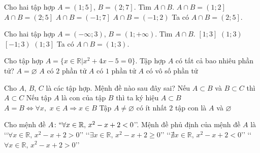 \begin{ex}%
Cho hai tập hợp $ A=\left(1;5 \right]$, $ B=\left(2;7 \right]$. Tìm $A\cap B$.	
	\choice
	{$ A\cap B=\left(1;2 \right]$}
	{\True $ A\cap B=\left(2;5 \right]$}
	{$ A\cap B=\left(-1;7 \right]$}
	{$ A\cap B=\left(-1;2 \right)$}
	\loigiai
	{
Ta có $ A\cap B=\left(2;5 \right]$.		
	}
\end{ex}
\begin{ex}%
	Cho hai tập hợp $ A=\left(-\infty;3 \right) $, $ B=\left(1;+\infty\right) $. Tìm $A\cap B$.	
	\choice
	{$\left[1;3 \right] $}
	{\True $\left(1;3\right) $}
	{$\left[-1;3 \right)  $}
	{$\left( 1;3 \right] $}
	\loigiai
	{
		Ta có $ A\cap B=\left(1;3\right)$.		
	}
\end{ex}
\begin{ex}%
	Cho tập hợp $A=\{x\in\mathbb{R}| x^2+4x-5=0\}$. Tập hợp $A$ có tất cả bao nhiêu phần tử?
	\choice
	{$A = \varnothing$}
	{\True $A$ có $2$ phần tử}
	{ $A$ có $1$ phần tử}
	{ $A$ có vô số phần tử}
\end{ex}
\begin{ex}%
	Cho $A$, $B$, $C$ là các tập hợp. Mệnh đề nào sau đây sai?
	\choice
	{Nếu $A\subset B$ và $B\subset C$ thì $A\subset C$}
	{Nếu tập $A$ là con của tập $B$ thì ta ký hiệu $A\subset B$}
	{\True $A=B\Leftrightarrow \forall x,\,\,x\in A \Rightarrow x\in B $}
	{ Tập $A \neq \varnothing$ có ít nhất $2$ tập con là $A$ và $\varnothing$}
\end{ex}
\begin{ex}%
	Cho mệnh đề $A\colon\lq\lq\forall x\in \mathbb{R},\,x^2-x+2<0$\rq\rq. Mệnh đề phủ định của mệnh đề $A$ là
	\choice 
	{ \lq\lq$\forall x\in \mathbb{R},\,x^2-x+2>0$\rq\rq}
	{ \True \lq\lq$\exists x\in \mathbb{R},\,x^2-x+2 \geq 0$\rq\rq}
	{ \lq\lq$\nexists x\in \mathbb{R},\,x^2-x+2 < 0$\rq\rq} 
	{ \lq\lq$\forall x\in \mathbb{R},\,x^2-x+2 > 0$\rq\rq}
\end{ex}

